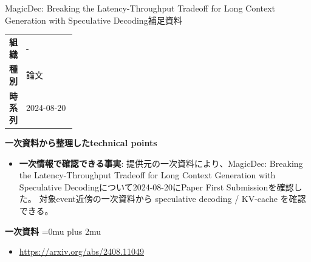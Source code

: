 \begin{technicalnote}{MagicDec: Breaking the Latency-Throughput Tradeoff for Long Context Generation with Speculative Decoding}{補足資料}
\begingroup
\begin{tabularx}{\linewidth}{@{}>{\bfseries}p{0.22\linewidth}X@{}}
組織 & - \\
種別 & 論文 \\
時系列 & 2024-08-20 \\
\end{tabularx}
\smallskip
{\bfseries 一次資料から整理したtechnical points}
\begin{itemize}[leftmargin=1.5em,itemsep=0.35em]
\item \textbf{一次情報で確認できる事実}: 提供元の一次資料により、MagicDec: Breaking the Latency-Throughput Tradeoff for Long Context Generation with Speculative Decodingについて2024-08-20にPaper First Submissionを確認した。 対象event近傍の一次資料から speculative decoding / KV-cache を確認できる。
\end{itemize}
\begin{minipage}{\linewidth}
\begin{samepage}
{\bfseries 一次資料}
\begingroup\sloppy
\Urlmuskip=0mu plus 2mu\relax
\begin{itemize}[leftmargin=1.5em,itemsep=0.25em]
\item {\scriptsize\url{https://arxiv.org/abs/2408.11049}}
\end{itemize}
\endgroup
\end{samepage}
\end{minipage}
\endgroup
\end{technicalnote}
\medskip


